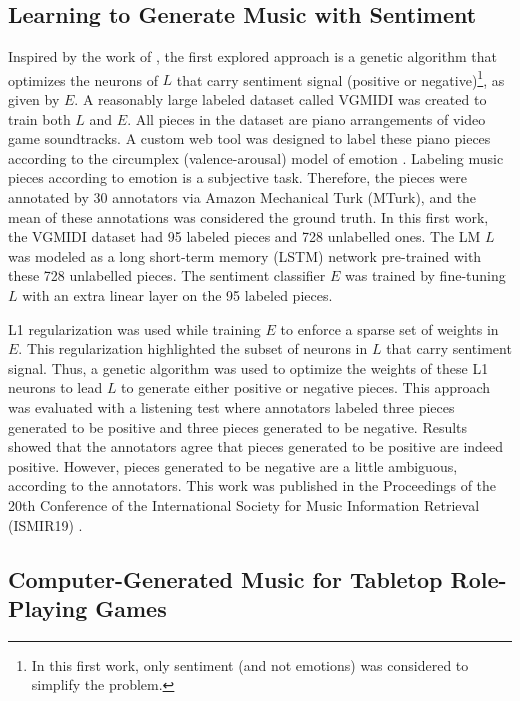 \subsection{Learning to Generate Music with Sentiment}

Inspired by the work of \citet{radford_2017}, the first explored approach is a genetic algorithm that optimizes the neurons of $L$ that carry sentiment signal (positive or negative)\footnote{In this first work, only sentiment (and not emotions) was considered to simplify the problem.}, as given by $E$. A reasonably large labeled dataset called VGMIDI was created to train both $L$ and $E$. All pieces in the dataset are piano arrangements of video game soundtracks. A custom web tool was designed to label these piano pieces according to the circumplex (valence-arousal) model of emotion \cite{russell1980circumplex}. Labeling music pieces according to emotion is a subjective task. Therefore, the pieces were annotated by 30 annotators via Amazon Mechanical Turk (MTurk), and the mean of these annotations was considered the ground truth. In this first work, the VGMIDI dataset had 95 labeled pieces and 728 unlabelled ones. The LM $L$ was modeled as a long short-term memory (LSTM) network pre-trained with these 728 unlabelled pieces. The sentiment classifier $E$ was trained by fine-tuning $L$ with an extra linear layer on the 95 labeled pieces.

L1 regularization was used while training $E$ to enforce a sparse set of weights in $E$. This regularization highlighted the subset of neurons in $L$ that carry sentiment signal. Thus, a genetic algorithm was used to optimize the weights of these L1 neurons to lead $L$ to generate either positive or negative pieces. This approach was evaluated with a listening test where annotators labeled three pieces generated to be positive and three pieces generated to be negative. Results showed that the annotators agree that pieces generated to be positive are indeed positive. However, pieces generated to be negative are a little ambiguous, according to the annotators. This work was published in the Proceedings of the 20th Conference of the International Society for Music Information Retrieval (ISMIR19) \cite{ferreira_2019}.

\subsection{Computer-Generated Music for Tabletop Role-Playing Games}

